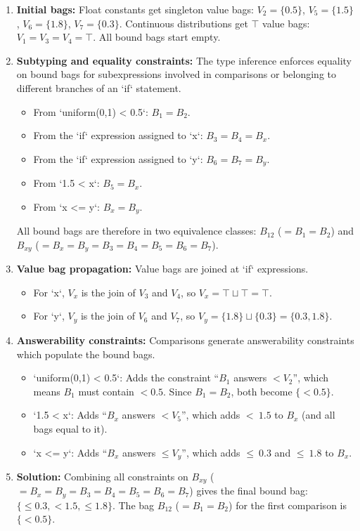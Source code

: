 \begin{enumerate}
    \item \textbf{Initial bags:}
    Float constants get singleton value bags: $V_2=\{0.5\}$, $V_5=\{1.5\}$, $V_6=\{1.8\}$, $V_7=\{0.3\}$.
    Continuous distributions get $\top$ value bags: $V_1=V_3=V_4=\top$.
    All bound bags start empty.

    \item \textbf{Subtyping and equality constraints:}
    The type inference enforces equality on bound bags for subexpressions involved in comparisons or belonging to different branches of an `if` statement.
    \begin{itemize}
        \item From `uniform(0,1) < 0.5`: $B_1 = B_2$.
        \item From the `if` expression assigned to `x`: $B_3 = B_4 = B_x$.
        \item From the `if` expression assigned to `y`: $B_6 = B_7 = B_y$.
        \item From `1.5 < x`: $B_5 = B_x$.
        \item From `x <= y`: $B_x = B_y$.
    \end{itemize}
    All bound bags are therefore in two equivalence classes: $B_{12}$ ($= B_1 = B_2$) and $B_{xy}$ ($=B_x=B_y=B_3=B_4=B_5=B_6=B_7$).

    \item \textbf{Value bag propagation:}
    Value bags are joined at `if` expressions.
    \begin{itemize}
        \item For `x`, $V_x$ is the join of $V_3$ and $V_4$, so $V_x = \top \sqcup \top = \top$.
        \item For `y`, $V_y$ is the join of $V_6$ and $V_7$, so $V_y = \{1.8\} \sqcup \{0.3\} = \{0.3, 1.8\}$.
    \end{itemize}

    \item \textbf{Answerability constraints:}
    Comparisons generate answerability constraints which populate the bound bags.
    \begin{itemize}
        \item `uniform(0,1) < 0.5`: Adds the constraint ``$B_1$ answers $<\!\!V_2$'', which means $B_1$ must contain $<\!0.5$. Since $B_1=B_2$, both become $\{<0.5\}$.
        \item `1.5 < x`: Adds ``$B_x$ answers $< V_5$'', which adds $<\ 1.5$ to $B_x$ (and all bags equal to it).
        \item `x <= y`: Adds ``$B_x$ answers $\leq V_y$'', which adds $\leq\ 0.3$ and $\leq\ 1.8$ to $B_x$.
    \end{itemize}

    \item \textbf{Solution:}
    Combining all constraints on $B_{xy}$ ($=B_x=B_y=B_3=B_4=B_5=B_6=B_7$) gives the final bound bag: $\{ \leq\!0.3, <\!1.5, \leq\!1.8 \}$. The bag $B_{12}$ ($=B_1=B_2$) for the first comparison is $\{ <\!0.5 \}$.
\end{enumerate}

